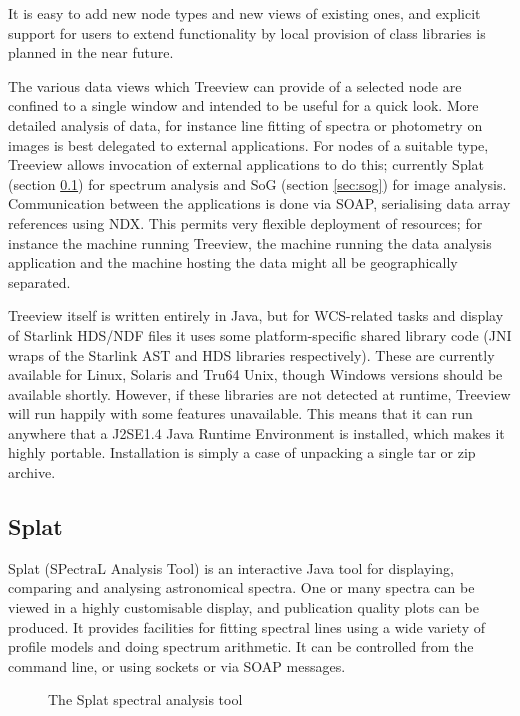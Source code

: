 It is easy to add new node types and new views of existing ones, 
and explicit support for users to extend functionality by local 
provision of class libraries is planned in the near future.

The various data views which Treeview can provide of a selected node
are confined to a single window and intended to be useful for a quick look.
More detailed analysis of data, for instance 
line fitting of spectra
or
photometry on images 
is best delegated to external applications.
For nodes of a suitable type, Treeview allows invocation of 
external applications to do this; currently 
Splat (section \ref{sec:splat}) for spectrum analysis
and
SoG (section \ref{sec:sog}) for image analysis.
Communication between the applications is done via SOAP, 
serialising data array references using NDX.
This permits very flexible deployment of resources; for instance the 
machine running Treeview, the machine running the data analysis 
application and the machine hosting the data might all be 
geographically separated.

Treeview itself is written entirely in Java, but for WCS-related tasks
and display of Starlink HDS/NDF files it uses some platform-specific 
shared library code (JNI wraps of the Starlink AST and HDS
libraries respectively).  These are currently available for 
Linux, Solaris and Tru64 Unix, though Windows versions should be
available shortly.
However, if these libraries 
are not detected at runtime, Treeview will run happily with some 
features unavailable.  This means that it can
run anywhere that a J2SE1.4 Java Runtime Environment is installed, 
which makes it highly portable.
Installation is simply a case of unpacking a single tar or zip archive.

\subsection{Splat}
\label{sec:splat}

Splat (SPectraL Analysis Tool) is an interactive Java tool for 
displaying, comparing and analysing astronomical spectra.
One or many spectra can be viewed in a highly customisable
display, and publication quality plots can be produced.
It provides facilities for fitting spectral lines using a wide
variety of profile models and doing spectrum arithmetic.
It can be controlled from the command line, or using sockets or 
via SOAP messages.
\begin{figure}
\caption{The Splat spectral analysis tool}
\end{figure}

